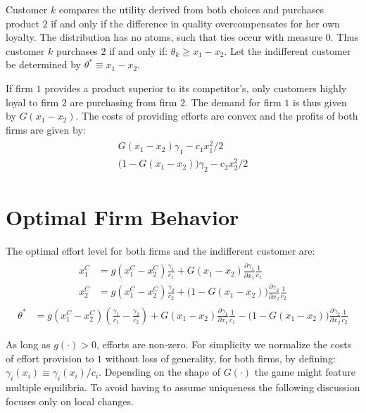 \documentclass[a4paper, 11pt]{article}
\begin{document}
Customer $k$ compares the utility derived from both choices and purchases product $2$ if and only if the difference in quality overcompensates for her own loyalty. The distribution has no atoms, such that ties occur with measure $0$. Thus customer $k$ purchases $2$ if and only if: $\theta_k\geq x_1-x_2$. Let the indifferent customer be determined by $\theta^* \equiv x_1-x_2$.

If firm $1$ provides a product superior to its competitor's, only customers highly loyal to firm $2$ are purchasing from firm $2$. The demand for firm $1$ is thus given by $G(x_1-x_2)$. The costs of providing efforts are convex and the profits of both firms are given by:
\begin{align}
\begin{split}
	G(x_1-x_2)\gamma_1 - c_1x_1^2/2\\
	\big(1-G(x_1-x_2)\big)\gamma_2 - c_2x_2^2/2
\end{split}
\end{align}

\section{Optimal Firm Behavior}

The optimal effort level for both firms and the indifferent customer are:
\begin{align}
\begin{split}
x_1^C &= g(x_1^C-x_2^C)\frac{\gamma_1}{c_1} + G(x_1-x_2)\frac{\partial \gamma_1}{\partial x_1}\frac{1}{c_1}\\
x_2^C &= g(x_1^C-x_2^C)\frac{\gamma_2}{c_2} + \big(1-G(x_1-x_2)\big)\frac{\partial \gamma_2}{\partial x_2}\frac{1}{c_2}
\end{split}
\end{align}
\begin{align}
\theta^* &=  g(x_1^C-x_2^C)\left(\frac{\gamma_1}{c_1}-\frac{\gamma_2}{c_2}\right) + G(x_1-x_2)\frac{\partial \gamma_1}{\partial x_1}\frac{1}{c_1} - \big(1-G(x_1-x_2)\big)\frac{\partial \gamma_2}{\partial x_2}\frac{1}{c_2}
\end{align}


As long as $g(\cdot)>0$, efforts are non-zero. For simplicity we normalize the costs of effort provision to $1$ without loss of generality, for both firms, by defining: $\gamma_i(x_i)\equiv \gamma_i(x_i)/c_i$. Depending on the shape of $G(\cdot)$ the game might feature multiple equilibria. To avoid having to assume uniqueness the following discussion focuses only on local changes. 
\end{document}
